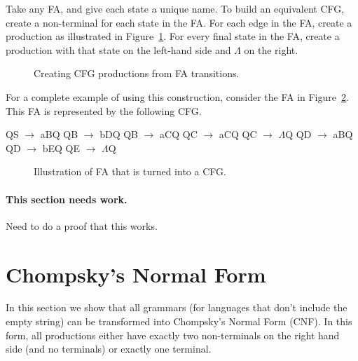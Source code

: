 \documentclass[letterpaper,12pt,openany,reqno]{book}%
\newcommand{\cfgprod}[2] {{\ttfamily #1} $\rightarrow$ {\ttfamily #2}}
\newcommand{\needswork}{\paragraph{This section needs work.}}
\newcommand{\fanonterminalnode}[2] {\node at (#1) (#2) [circle, draw, minimum size=24pt] {#2};}
\newcommand{\fatransition}[3] {\draw [->] (#1) -- (#2) node [midway, above] {#3};}
\newcommand{\farighttransition}[3] {\draw [->] (#1) -- (#2) node [midway, right] {#3};}
\newcommand{\faarctransition}[5] {\draw [->] (#1) to[out=#4, in=#5] node  [midway, above] {#3} (#2) ;}
\newcommand{\faloopright}[2] {\draw (#1) edge [loop right] node {#2} ();}
\begin{document}
Take any FA, and give each state a unique name. To build an equivalent CFG, create a non-terminal for each state in the FA. For each edge in the FA, create a production as illustrated in Figure~\ref{F.FA.2.CFG}. For every final state in the FA, create a production with that state on the left-hand side and $\Lambda$ on the right.
\begin{figure}[hbt]
\centering
{}
 \caption{Creating CFG productions from FA transitions.}
  \label{F.FA.2.CFG}
\end{figure}
For a complete example of using this construction, consider the FA in Figure~\ref{F.FA.to.CFG.example}. This FA is represented by the following CFG.
\begin{cfg}{}{}
Q\cfgprod{S}{aB}Q
Q\cfgprod{B}{bD}Q
Q\cfgprod{B}{aC}Q
Q\cfgprod{C}{aC}Q
Q\cfgprod{C}{$\Lambda$}Q
Q\cfgprod{D}{aB}Q
Q\cfgprod{D}{bE}Q
Q\cfgprod{E}{$\Lambda$}Q
\end{cfg}

\begin{figure}[hbt]
\centering
{}
 \caption{Illustration of FA that is turned into a CFG.}
  \label{F.FA.to.CFG.example}
\end{figure}
\needswork
Need to do a proof that this works.

\section{Chompsky's Normal Form}
In this section we show that all grammars (for languages that don't include the empty string) can be transformed into Chompsky's Normal Form (CNF). In this form, all productions either have exactly two non-terminals on the right hand side (and no terminals) or exactly one terminal.
\end{document}

